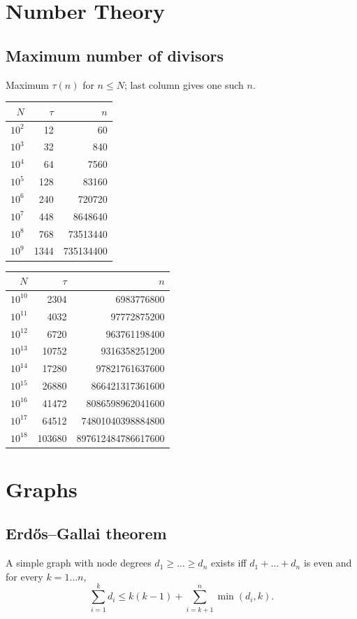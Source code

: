 \section{Number Theory}

\subsection{Maximum number of divisors}
Maximum $\tau(n)$ for $n\le N$; last column gives one such $n$.

\begin{center}
\scriptsize
\begin{tabular}{r|r|r}
$N$ & $\tau$ & $n$ \\ \hline
$10^2$ & 12 & 60 \\
$10^3$ & 32 & 840 \\
$10^4$ & 64 & 7560 \\
$10^5$ & 128 & 83160 \\
$10^6$ & 240 & 720720 \\
$10^7$ & 448 & 8648640 \\
$10^8$ & 768 & 73513440 \\
$10^9$ & 1344 & 735134400
\end{tabular}
\qquad
\begin{tabular}{r|r|r}
$N$ & $\tau$ & $n$ \\ \hline
$10^{10}$ & 2304 & 6983776800 \\
$10^{11}$ & 4032 & 97772875200 \\
$10^{12}$ & 6720 & 963761198400 \\
$10^{13}$ & 10752 & 9316358251200 \\
$10^{14}$ & 17280 & 97821761637600 \\
$10^{15}$ & 26880 & 866421317361600 \\
$10^{16}$ & 41472 & 8086598962041600 \\
$10^{17}$ & 64512 & 74801040398884800 \\
$10^{18}$ & 103680 & 897612484786617600
\end{tabular}
\normalsize
\end{center}


 \section{Graphs}

\subsection{Erdős–Gallai theorem}
	A simple graph with node degrees $d_1 \ge \ldots \ge d_n$ exists iff $d_1 + \ldots + d_n$ is even and for every $k = 1\ldots n$,
	\[ \sum _{i=1}^{k}d_{i}\leq k(k-1)+\sum _{i=k+1}^{n}\min(d_{i},k). \]


